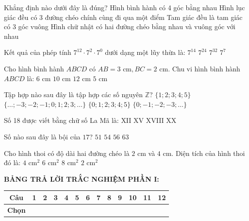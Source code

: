 \documentclass[12pt,a4paper]{article}
\begin{document}
\begin{ex}
Khẳng định nào dưới đây là đúng?
\choice
{Hình bình hành có 4 góc bằng nhau}
{\True Hình lục giác đều có 3 đường chéo chính cùng đi qua một điểm}
{Tam giác đều là tam giác có 3 góc vuông}
{Hình chữ nhật có hai đường chéo bằng nhau và vuông góc với nhau}
\end{ex}

\begin{ex}
Kết quả của phép tính $7^{12} \cdot 7^2 \cdot 7^0$ dưới dạng một lũy thừa là:
\choice
{\True $7^{14}$}
{$7^{24}$}
{$7^{32}$}
{$7^7$}
\end{ex}

\begin{ex}
Cho hình bình hành $ABCD$ có $AB = 3\text{ cm}, BC = 2\text{ cm}$. Chu vi hình bình hành $ABCD$ là:
\choice
{$6\text{ cm}$}
{\True $10\text{ cm}$}
{$12\text{ cm}$}
{$5\text{ cm}$}
\end{ex}

\begin{ex}
Tập hợp nào sau đây là tập hợp các số nguyên $\mathbb{Z}$?
\choice
{$\{1; 2; 3; 4; 5\}$}
{\True $\{\dots; -3; -2; -1; 0; 1; 2; 3; \dots\}$}
{$\{0; 1; 2; 3; 4; 5\}$}
{$\{0; -1; -2; -3; \dots\}$}
\end{ex}

\begin{ex}
Số 18 được viết bằng chữ số La Mã là:
\choice
{XII}
{XV}
{\True XVIII}
{XX}
\end{ex}

\begin{ex}
Số nào sau đây là bội của $17$?
\choice
{\True $51$}
{$54$}
{$56$}
{$63$}
\end{ex}

\begin{ex}
Cho hình thoi có độ dài hai đường chéo là $2\text{ cm}$ và $4\text{ cm}$. Diện tích của hình thoi đó là:
\choice
{\True $4\text{ cm}^2$}
{$6\text{ cm}^2$}
{$8\text{ cm}^2$}
{$2\text{ cm}^2$}
\end{ex}


\vspace{1mm}
\noindent\textbf{BẢNG TRẢ LỜI TRẮC NGHIỆM PHẦN I:}
\begin{center}
\begin{tabular}{|c|c|c|c|c|c|c|c|c|c|c|c|c|}
\hline
\textbf{Câu} & \textbf{1} & \textbf{2} & \textbf{3} & \textbf{4} & \textbf{5} & \textbf{6} & \textbf{7} & \textbf{8} & \textbf{9} & \textbf{10} & \textbf{11} & \textbf{12} \\
\hline
\textbf{Chọn} & \rule{0pt}{0.65cm} & & & & & & & & & & & \\
\hline
\end{tabular}
\end{center}
\vspace{2mm}
\end{document}
